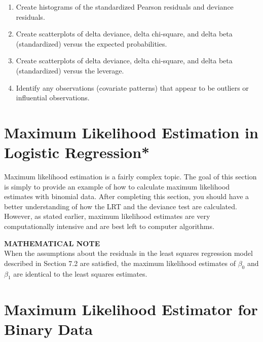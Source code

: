 \documentclass[
]{report}
\providecommand{\tightlist}{%
  \setlength{\itemsep}{0pt}\setlength{\parskip}{0pt}}
\begin{document}
\begin{enumerate}
\def\labelenumi{\alph{enumi}.}
\tightlist
\item
  Create histograms of the standardized Pearson residuals and deviance residuals.\\
\item
  Create scatterplots of delta deviance, delta chi‐square, and delta beta (standardized) versus the expected probabilities.\\
\item
  Create scatterplots of delta deviance, delta chi‐square, and delta beta (standardized) versus the leverage.\\
\item
  Identify any observations (covariate patterns) that appear to be outliers or influential observations.
\end{enumerate}

\section{\texorpdfstring{\textbf{Maximum Likelihood Estimation in Logistic Regression}*}{Maximum Likelihood Estimation in Logistic Regression*}}\label{maximum-likelihood-estimation-in-logistic-regression}

Maximum likelihood estimation is a fairly complex topic. The goal of this section is simply to provide an example of how to calculate maximum likelihood estimates with binomial data. After completing this section, you should have a better understanding of how the LRT and the deviance test are calculated. However, as stated earlier, maximum likelihood estimates are very computationally intensive and are best left to computer algorithms.

\large

\textbf{MATHEMATICAL NOTE}\\
When the assumptions about the residuals in the least squares regression model described in Section 7.2 are satisfied, the maximum likelihood estimates of \(\beta_0\) and \(\beta_1\) are identical to the least squares estimates.\\
\normalsize

\section*{Maximum Likelihood Estimator for Binary Data}\label{maximum-likelihood-estimator-for-binary-data}
\end{document}
